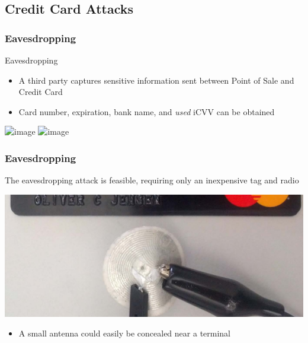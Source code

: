 \documentclass[unknownkeysallowed]{beamer}
\begin{document}
\subsection{Credit Card Attacks}
\begin{frame}
\frametitle{Eavesdropping}\centering
     \begin{minipage}{.7\textwidth}
              \begin{block}{Eavesdropping}
                \begin{itemize}
                  \item{A third party captures sensitive information sent between Point of Sale and Credit Card}
                  \item<3->{Card number, expiration, bank name, and \textit{used} iCVV can be obtained}
                \end{itemize}
              \end{block}
              \begin{center}
                \includegraphics<1>[width=.7\linewidth,height=\textheight,keepaspectratio]{figures/CCeaves0.png}
                \includegraphics<2->[width=.7\linewidth,height=\textheight,keepaspectratio]{figures/CCeaves.png}
              \end{center}
     \end{minipage}
\end{frame}

\begin{frame}
\frametitle{Eavesdropping}\centering
     \begin{minipage}{.7\textwidth}
          The eavesdropping attack is feasible, requiring only an inexpensive tag and radio
              \begin{center}
                \includegraphics[width=.7\linewidth,height=\textheight,keepaspectratio]{../TomPaper/figures/eavesdroppingAntenna.png}
              \end{center}
              \begin{itemize}
                \pause
                \item{A small antenna could easily be concealed near a terminal}
              \end{itemize}
     \end{minipage}
\end{frame}
\end{document}
